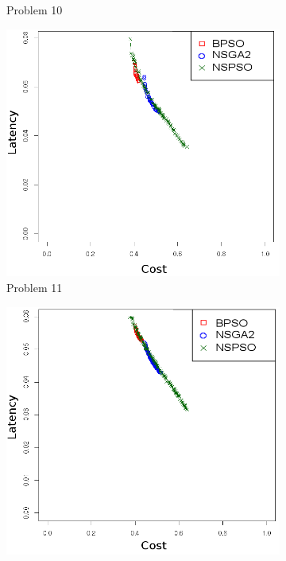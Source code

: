 \begin{figure}[t]
\begin{subfigure}{0.30\textwidth}
	   \caption{Problem 10}
   \end{subfigure}
   \begin{subfigure}{0.30\textwidth}
       \includegraphics[width=\textwidth]{pics/nsgabpso11.png}
	   \caption{Problem 11}
   \end{subfigure}
   \begin{subfigure}{0.30\textwidth}
       \includegraphics[width=\textwidth]{pics/nsgabpso12.png}

\end{subfigure}
\end{figure}
